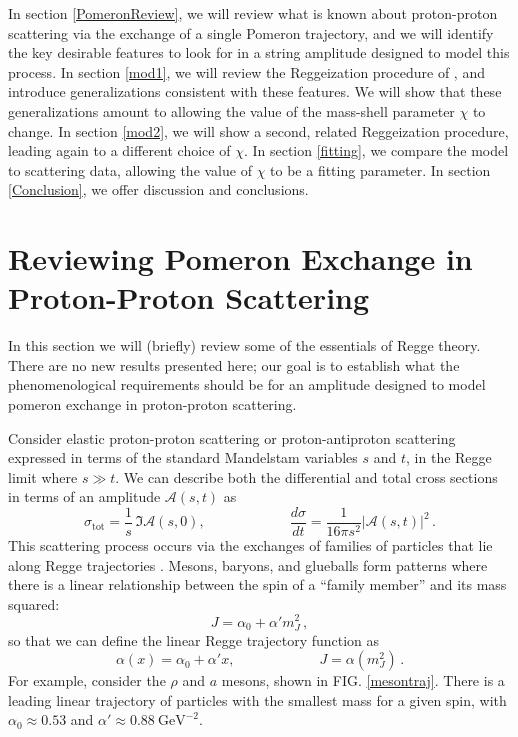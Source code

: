 \documentclass[aps, prd, preprintnumbers, floatfix, showpacs, showkeys, nofootinbib, 10pt]{revtex4-1}
\def\beq{\begin{equation}}
\def\eeq{\end{equation}}
\begin{document}
In section \ref{PomeronReview}, we will review what is known about proton-proton scattering via the exchange of a single Pomeron trajectory, and we will identify the key desirable features to look for in a string amplitude designed to model this process.  In section \ref{mod1}, we will review the Reggeization procedure of \cite{DHM}, and introduce generalizations consistent with these features.  We will show that these generalizations amount to allowing the value of the mass-shell parameter $\chi$ to change.  In section \ref{mod2}, we will show a second, related Reggeization procedure, leading again to a different choice of $\chi$.  In section \ref{fitting}, we compare the model to scattering data, allowing the value of $\chi$ to be a fitting parameter. In section \ref{Conclusion}, we offer discussion and conclusions.

\section{\label{PomeronReview} Reviewing Pomeron Exchange in Proton-Proton Scattering}

In this section we will (briefly) review some of the essentials of Regge theory.  There are no new results presented here; our goal is to establish what the phenomenological requirements should be for an amplitude designed to model pomeron exchange in proton-proton scattering.  

Consider elastic proton-proton scattering or proton-antiproton scattering expressed in terms of the standard Mandelstam variables $s$ and $t$, in the Regge limit where $s \gg t$.  We can describe both the differential and total cross sections in terms of an amplitude $\mathcal{A}(s, t)$ as
\beq
\sigma_{\mathrm{tot}} = \frac{1}{s} \, \Im\mathcal{A}(s, 0), \hspace{1in} \frac{d\sigma}{dt} = \frac{1}{16\pi s^2}\left|\mathcal{A}(s, t)\right|^2 \, .
\eeq
This scattering process occurs via the exchanges of families of particles that lie along Regge trajectories \cite{earlyRegge}.  Mesons, baryons, and glueballs form patterns where there is a linear relationship between the spin of a ``family member'' and its mass squared:
\beq
J = \alpha_0 + \alpha' m_J^2 \, ,
\eeq
so that we can define the linear Regge trajectory function as
\beq
\alpha(x) = \alpha_0 + \alpha' x, \hspace{1in} J = \alpha(m_J^2) \, .
\eeq
For example, consider the $\rho$ and $a$ mesons, shown in FIG. \ref{mesontraj}.  There is a leading linear trajectory of particles with the smallest mass for a given spin, with $\alpha_0 \approx 0.53$ and $\alpha' \approx 0.88 \ \mathrm{GeV}^{-2}$.  
\end{document}
